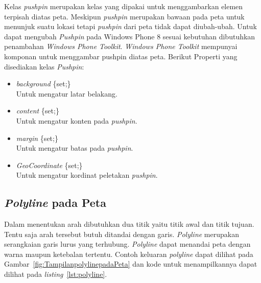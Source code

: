 \hspace{0.5cm} Kelas \textit{pushpin} merupakan kelas yang dipakai untuk menggambarkan elemen terpisah diatas peta. Meskipun \textit{pushpin} merupakan bawaan pada peta untuk menunjuk suatu lokasi tetapi \textit{pushpin} dari peta tidak dapat diubah-ubah. Untuk dapat mengubah \textit{Pushpin} pada Windows Phone 8 sesuai kebutuhan dibutuhkan penambahan \textit{Windows Phone Toolkit}. \textit{Windows Phone Toolkit} mempunyai komponan untuk menggambar pushpin diatas peta.  
Berikut Properti yang disediakan kelas \textit{Pushpin}:
\begin{itemize}
	\item \textit{background} \{set;\} \\
	Untuk mengatur latar belakang.
	\item \textit{content} \{set;\} \\
	Untuk mengatur konten pada \textit{pushpin}.
	\item \textit{margin} \{set;\} \\
	Untuk mengatur batas pada \textit{pushpin}.
	\item \textit{GeoCoordinate} \{set;\} \\
	Untuk mengatur kordinat peletakan \textit{pushpin}.
\end{itemize}

\subsection{\textit{Polyline} pada Peta\cite{MSDN}}
\label{subsubsec:Polyline pada Peta}
\hspace{0.5cm} Dalam menentukan arah dibutuhkan dua titik yaitu titik awal dan titik tujuan. Tentu saja arah tersebut butuh ditandai dengan garis. \textit{Polyline} merupakan serangkaian garis lurus yang terhubung. \textit{Polyline} dapat menandai peta dengan warna maupun ketebalan tertentu. Contoh keluaran \textit{polyline} dapat dilihat pada Gambar~\ref{fig:TampilanpolylinepadaPeta} dan kode untuk menampilkannya dapat dilihat pada \textit{listing}~\ref{lst:polyline}.

